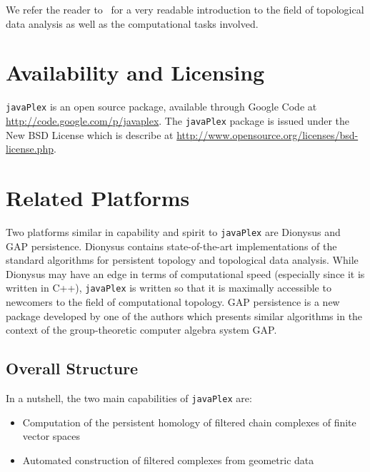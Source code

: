 \documentclass{gts2012}
\newcommand\javaPlex{\texttt{javaPlex}\xspace}
\begin{document}
We refer the reader to~\cite{Carlsson_09} for a very readable introduction to the field of topological data analysis as well as the computational tasks involved.

\section{Availability and Licensing}

\javaPlex is an open source package, available through Google Code at \url{http://code.google.com/p/javaplex}. The \javaPlex package is issued under the New BSD License which is describe at \url{http://www.opensource.org/licenses/bsd-license.php}. 

\section{Related Platforms}

Two platforms similar in capability and spirit to \javaPlex are Dionysus and GAP persistence. Dionysus contains state-of-the-art implementations of the standard algorithms for persistent topology and topological data analysis. While Dionysus may have an edge in terms of computational speed (especially since it is written in C++), \javaPlex is written so that it is maximally accessible to newcomers to the field of computational topology. GAP persistence is a new package developed by one of the authors which presents similar algorithms in the context of the group-theoretic computer algebra system GAP.


\subsection{Overall Structure}

In a nutshell, the two main capabilities of \javaPlex are:
\begin{itemize}
\item Computation of the persistent homology of filtered chain complexes of finite vector spaces
\item Automated construction of filtered complexes from geometric data 
\end{itemize}
\end{document}
